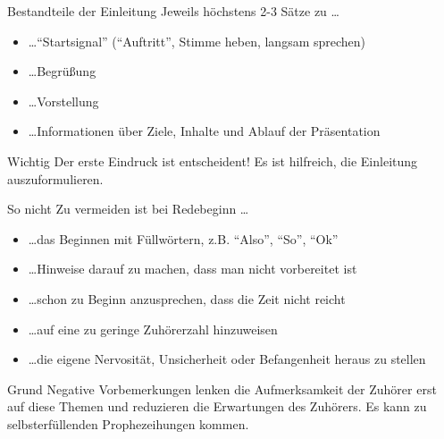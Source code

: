 \begin{frame}{Bestandteile der Einleitung}
    Jeweils höchstens 2-3 Sätze zu \dots
    \begin{itemize}[<+->]
        \item \dots "`Startsignal"' ("`Auftritt"', Stimme heben, langsam sprechen)
        \item \dots Begrüßung
        \item \dots Vorstellung
        \item \dots Informationen über Ziele, Inhalte und Ablauf der Präsentation
    \end{itemize}

    \pause[\thebeamerpauses]
    \begin{alertblock}{Wichtig}
        Der erste Eindruck ist entscheident! Es ist hilfreich, die 
        Einleitung auszuformulieren.
    \end{alertblock}
\end{frame}

\begin{frame}{So nicht}
    Zu vermeiden ist bei Redebeginn \dots
    \begin{itemize}[<+->]
        \item \dots das Beginnen mit Füllwörtern, z.B. "`Also"', "`So"', "`Ok"'
        \item \dots Hinweise darauf zu machen, dass man nicht vorbereitet ist
        \item \dots schon zu Beginn anzusprechen, dass die Zeit nicht reicht
        \item \dots auf eine zu geringe Zuhörerzahl hinzuweisen
        \item \dots die eigene Nervosität, Unsicherheit oder Befangenheit heraus zu stellen
    \end{itemize}

    \pause[\thebeamerpauses]
    \begin{block}{Grund}
        Negative Vorbemerkungen lenken die Aufmerksamkeit der 
        Zuhörer erst auf diese Themen und reduzieren die Erwartungen 
        des Zuhörers. Es kann zu selbsterfüllenden Prophezeihungen 
        kommen.
    \end{block}
\end{frame}

